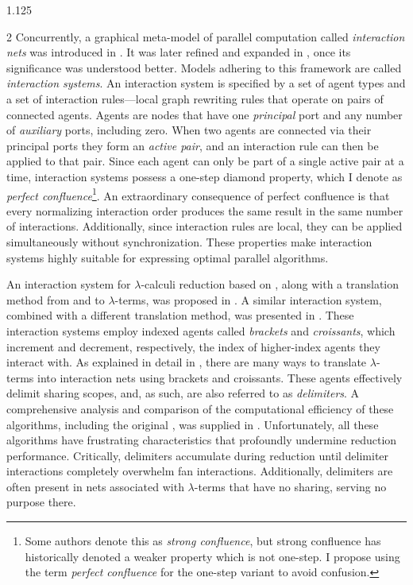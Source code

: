 \documentclass[10pt]{article}
\begin{document}
\begin{spacing}{1.125}
\begin{multicols}{2}
Concurrently, a graphical meta-model of parallel computation called \textit{interaction nets} was introduced in \cite{Laf90}. It was later refined and expanded in \cite{Laf97}, once its significance was understood better.
Models adhering to this framework are called \textit{interaction systems}. An interaction system is specified by a set of agent types and a set of interaction rules---local graph rewriting rules that operate on pairs of connected agents. Agents are nodes that have one \textit{principal} port and any number of \textit{auxiliary} ports, including zero. When two agents are connected via their principal ports they form an \textit{active pair}, and an interaction rule can then be applied to that pair. Since each agent can only be part of a single active pair at a time, interaction systems possess a one-step diamond property, which I denote as \textit{perfect confluence}\footnote{Some authors denote this as \textit{strong confluence}, but strong confluence has historically denoted a weaker property which is not one-step. I propose using the term \textit{perfect confluence} for the one-step variant to avoid confusion.}.
An extraordinary consequence of perfect confluence is that every normalizing interaction order produces the same result in the same number of interactions.
Additionally, since interaction rules are local, they can be applied simultaneously without synchronization. These properties make interaction systems highly suitable for expressing optimal parallel algorithms.

An interaction system for \mbox{$\lambda$-calculi} reduction based on \cite{Lam89}, along with a translation method from and to \mbox{$\lambda$-terms}, was proposed in \cite{GAL92a, GAL92b}. A similar interaction system, combined with a different translation method, was presented in \cite{AG98}.
These interaction systems employ indexed agents called \textit{brackets} and \textit{croissants}, which increment and decrement, respectively, the index of higher-index agents they interact with.
As explained in detail in \cite{AG98}, there are many ways to translate \mbox{$\lambda$-terms} into interaction nets using brackets and croissants.
These agents effectively delimit sharing scopes, and, as such, are also referred to as \textit{delimiters}.
A comprehensive analysis and comparison of the computational efficiency of these algorithms, including the original \cite{Lam89},
was supplied in \cite{LM99}. Unfortunately, all these algorithms have frustrating characteristics that profoundly undermine reduction performance. Critically, delimiters accumulate during reduction until delimiter interactions completely overwhelm fan interactions. Additionally, delimiters are often present in nets associated with \mbox{$\lambda$-terms} that have no sharing, serving no purpose there.


\end{multicols}
\end{spacing}
\end{document}
